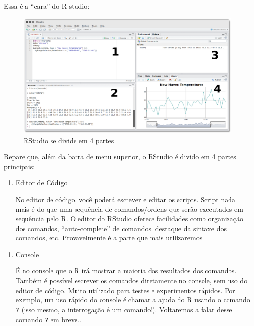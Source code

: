 \documentclass[]{book}
\providecommand{\tightlist}{%
  \setlength{\itemsep}{0pt}\setlength{\parskip}{0pt}}
\begin{document}
Essa é a ``cara'' do R studio:

\begin{figure}

{\centering \includegraphics[width=1\linewidth]{imagens/RStudio_001} 

}

\caption{RStudio se divide em 4 partes}\label{fig:unnamed-chunk-4}
\end{figure}

Repare que, além da barra de menu superior, o RStudio é divido em 4
partes principais:

\begin{enumerate}
\def\labelenumi{\arabic{enumi}.}
\tightlist
\item
  Editor de Código

  No editor de código, você poderá escrever e editar os scripts. Script
  nada mais é do que uma sequência de comandos/ordens que serão
  executados em sequência pelo R. O editor do RStudio oferece
  facilidades como organização dos comandos, ``auto-complete'' de
  comandos, destaque da sintaxe dos comandos, etc. Provavelmente é a
  parte que mais utilizaremos.
\end{enumerate}

\begin{enumerate}
\def\labelenumi{\arabic{enumi}.}
\setcounter{enumi}{1}
\tightlist
\item
  Console

  É no console que o R irá mostrar a maioria dos resultados dos
  comandos. Também é possível escrever os comandos diretamente no
  console, sem uso do editor de código. Muito utilizado para testes e
  experimentos rápidos. Por exemplo, um uso rápido do console é chamar a
  ajuda do R usando o comando \texttt{?} (isso mesmo, a interrogação é
  um comando!). Voltaremos a falar desse comando \texttt{?} em breve..
\end{enumerate}
\end{document}
